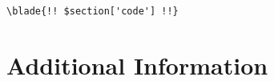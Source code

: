 \documentclass{article}
\newcommand{\blade}[1]{}
\begin{document}
\title{\blade{{ $title }}}
\author{\blade{{ $author }}}
\date{\blade{{ $date }}}
\maketitle

\tableofcontents

\blade{@foreach($sections as $section)}
\section{\blade{{ $section['title'] }}}
\blade{{ $section['content'] }}

\blade{@if(isset($section['code']))}
\begin{verbatim}
\blade{!! $section['code'] !!}
\end{verbatim}
\blade{@endif}

\blade{@endforeach}

\blade{@if($includeAppendix)}
\appendix
\section{Additional Information}
\blade{!! $appendixContent !!}
\blade{@endif}
\end{document}
